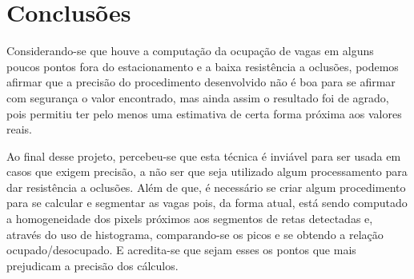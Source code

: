 \documentclass[10pt,twocolumn,letterpaper]{article}
\begin{document}
\section{Conclusões}

	Considerando-se que houve a computação da ocupação de vagas em alguns poucos pontos
fora do estacionamento e a baixa resistência a oclusões, podemos afirmar que a precisão do
procedimento desenvolvido não é boa para se afirmar com segurança o valor encontrado, mas
ainda assim o resultado foi de agrado, pois permitiu ter pelo menos uma estimativa de certa forma
próxima aos valores reais.

	Ao final desse projeto, percebeu-se que esta técnica é inviável para ser usada em casos que
exigem precisão, a não ser que seja utilizado algum processamento para dar resistência a oclusões.
Além de que, é necessário se criar algum procedimento para se calcular e segmentar as vagas pois,
da forma atual, está sendo computado a homogeneidade dos pixels próximos aos segmentos de retas
detectadas e, através do uso de histograma, comparando-se os picos e se obtendo a relação
ocupado/desocupado. E acredita-se que sejam esses os pontos que mais prejudicam a precisão dos cálculos.



{\small


}
\end{document}
